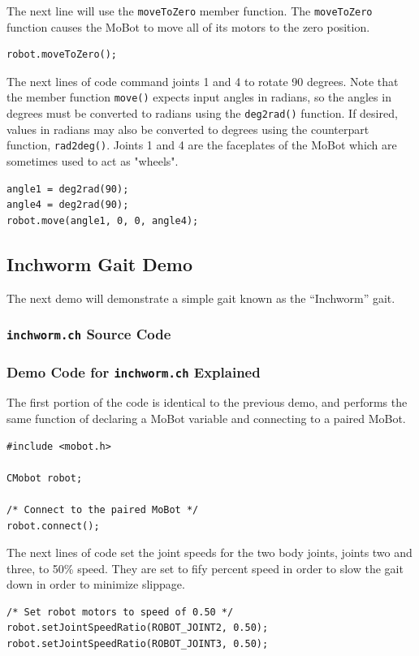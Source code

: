 \documentclass{article}
\begin{document}
The next line will use the \texttt{moveToZero} member function. The
\texttt{moveToZero} function causes the MoBot to move all of its motors to the
zero position.
\begin{verbatim}
robot.moveToZero();
\end{verbatim}

The next lines of code command joints 1 and 4 to rotate 90 degrees.
Note that the member function \texttt{move()} expects input angles
in radians, so the angles in degrees must be converted to radians
using the \texttt{deg2rad()} function. If desired, values in radians
may also be converted to degrees using the counterpart function,
\texttt{rad2deg()}.
Joints 1 and 4 are the faceplates
of the MoBot which are sometimes used to act as "wheels".
\begin{verbatim}
angle1 = deg2rad(90);
angle4 = deg2rad(90);
robot.move(angle1, 0, 0, angle4);
\end{verbatim}

\subsection{Inchworm Gait Demo}
The next demo will demonstrate a simple gait known as the ``Inchworm'' gait.

\subsubsection{\texttt{inchworm.ch} Source Code}


\subsubsection{Demo Code for \texttt{inchworm.ch} Explained}
The first portion of the code is identical to the previous demo, and performs
the same function of declaring a MoBot variable and connecting to a 
paired MoBot.
\begin{verbatim}
#include <mobot.h>

CMobot robot;

/* Connect to the paired MoBot */
robot.connect();
\end{verbatim}

The next lines of code set the joint speeds for the two body joints, joints 
two and three, to 50\% speed. They are set to fify percent speed in order to 
slow the gait down in order to minimize slippage.

\begin{verbatim}
/* Set robot motors to speed of 0.50 */
robot.setJointSpeedRatio(ROBOT_JOINT2, 0.50);
robot.setJointSpeedRatio(ROBOT_JOINT3, 0.50);
\end{verbatim}
\end{document}
